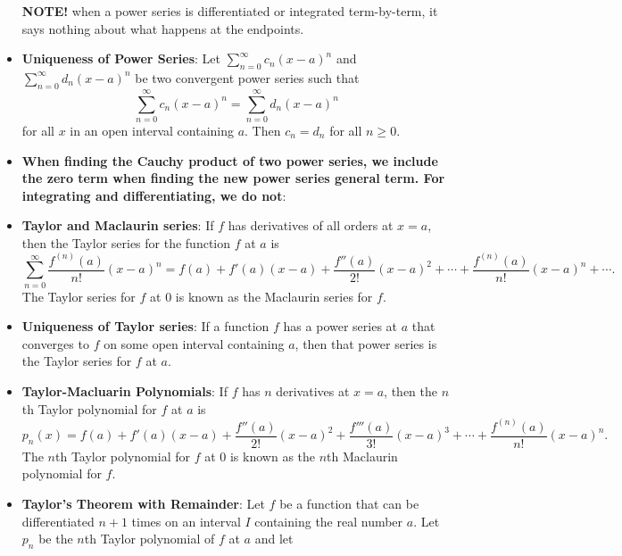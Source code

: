 \documentclass{report}
\begin{document}
\begin{itemize}
                \bigbreak \noindent 
                \textbf{NOTE!} when a power series is differentiated or integrated term-by-term, it says nothing about what happens at the endpoints.
            \item \textbf{Uniqueness of Power Series}:
                Let $\sum_{n=0}^{\infty} c_n (x - a)^n$ and $\sum_{n=0}^{\infty} d_n (x - a)^n$ be two convergent power series such that
                \[
                    \sum_{n=0}^{\infty} c_n (x - a)^n = \sum_{n=0}^{\infty} d_n (x - a)^n
                \]
                for all \( x \) in an open interval containing \( a \). Then \( c_n = d_n \) for all \( n \geq 0 \).
            \item \textbf{When finding the Cauchy product of two power series, we include the zero term when finding the new power series general term. For integrating and differentiating, we do not}:
            \item \textbf{Taylor and Maclaurin series}:
                If $f$ has derivatives of all orders at $x=a$, then the Taylor series for the function $f$ at $a$ is
                \begin{equation}
                    \sum_{n=0}^{\infty} \frac{f^{(n)}(a)}{n!}(x-a)^n = f(a) + f'(a)(x-a) + \frac{f''(a)}{2!}(x-a)^2 + \cdots + \frac{f^{(n)}(a)}{n!}(x-a)^n + \cdots.
                \end{equation}
                The Taylor series for $f$ at $0$ is known as the Maclaurin series for $f$.
                \bigbreak \noindent 
            \item \textbf{Uniqueness of Taylor series}:  If a function $f$ has a power series at $a$ that converges to $f$ on some open interval containing $a$, then that power series is the Taylor series for $f$ at $a$.
            \item \textbf{Taylor-Macluarin Polynomials}:         
                If $f$ has $n$ derivatives at $x=a$, then the $n$th Taylor polynomial for $f$ at $a$ is
                \begin{equation}
                    p_n(x) = f(a) + f'(a)(x-a) + \frac{f''(a)}{2!}(x-a)^2 + \frac{f'''(a)}{3!}(x-a)^3 + \cdots + \frac{f^{(n)}(a)}{n!}(x-a)^n.
                \end{equation}
                The $n$th Taylor polynomial for $f$ at $0$ is known as the $n$th Maclaurin polynomial for $f$.
            \item \textbf{Taylor’s Theorem with Remainder}:
                Let $f$ be a function that can be differentiated $n+1$ times on an interval $I$ containing the real number $a$. Let $p_n$ be the $n$th Taylor polynomial of $f$ at $a$ and let

\end{itemize}
\end{document}
